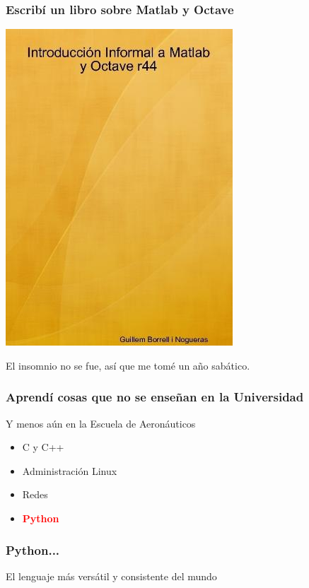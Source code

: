 \documentclass[12pt,mathserif,compress]{beamer}
\begin{document}
\begin{frame}
  \frametitle{Escribí un libro sobre Matlab y Octave}
  \begin{center}
  \includegraphics[height=0.6\textheight]{files/portada.jpg}    
  \end{center}
\end{frame}

\begin{frame}
  \begin{center}
    El insomnio no se fue, así que me tomé un año sabático.
  \end{center}
\end{frame}

\begin{frame}
  \frametitle{Aprendí cosas que no se enseñan en la Universidad}
Y menos aún en la Escuela de Aeronáuticos
\begin{itemize}
\item C y C++
\pause
\item Administración Linux
\pause
\item Redes
\pause
\item \textcolor{red}{\textbf{Python}}
\end{itemize}
\end{frame}

\begin{frame}
\frametitle{Python...}
\begin{center}
El lenguaje más versátil y consistente del mundo  
\end{center}

\end{frame}
\end{document}
